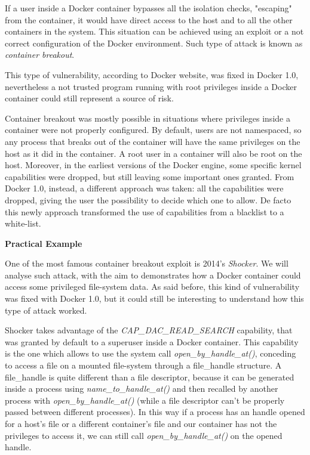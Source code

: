 \documentclass[a4paper,12pt]{article}
\begin{document}
If a user inside a Docker container bypasses all the isolation checks,
"escaping" from the container, it would have direct access to the host and to
all the other containers in the system. This situation can be achieved using an
exploit or a not correct configuration of the Docker environment. Such type of
attack is known as \textit{container breakout}.\par This type of vulnerability,
according to Docker website\cite{docker_blog_about_container_breakout}, was
fixed in Docker 1.0, nevertheless a not trusted program running with root
privileges inside a Docker container could still represent a source of risk.
\par Container breakout was mostly possible in situations where privileges
inside a container were not properly configured. By default, users are not
namespaced, so any process that breaks out of the container will have the same
privileges on the host as it did in the container. A root user in a container
will also be root on the host. Moreover, in the earliest versions of the Docker
engine, some specific kernel capabilities were dropped, but still leaving some
important ones granted. From Docker 1.0, instead, a different approach was
taken: all the capabilities were dropped, giving the user the possibility to
decide which one to allow. De facto this newly approach transformed the use of
capabilities from a blacklist to a white-list.

\bigbreak\textbf{Practical Example}\bigbreak 

One of the most famous container breakout exploit is 2014's
\textit{Shocker}\cite{shocker}. We will analyse such attack, with the aim to
demonstrates how a Docker container could access some privileged file-system
data. As said before, this kind of vulnerability was fixed with Docker 1.0, but
it could still be interesting to understand how this type of attack
worked\cite{shocker_how_it_works}.\par Shocker takes advantage of the
\textit{CAP\_DAC\_READ\_SEARCH} capability, that was granted by default to a
superuser inside a Docker container. This capability is the one which allows to
use the system call \textit{open\_by\_handle\_at()}, conceding to access a file
on a mounted file-system through a file\_handle structure. A file\_handle is
quite different than a file descriptor, because it can be generated inside a
process using \textit{name\_to\_handle\_at()} and then recalled by another
process with \textit{open\_by\_handle\_at()} (while a file descriptor can't be
properly passed between different processes). In this way if a process has an
handle opened for a host's file or a different container's file and our
container has not the privileges to access it, we can still call
\textit{open\_by\_handle\_at()} on the opened handle.
\end{document}
